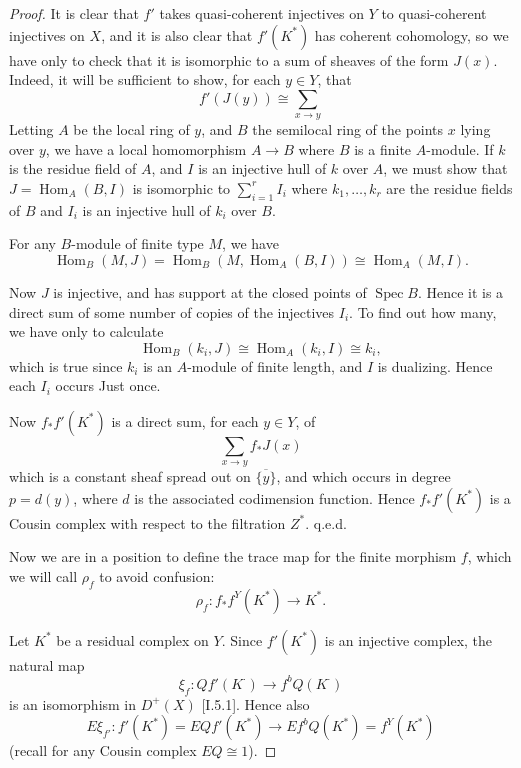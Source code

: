 \documentclass[12pt]{book}
\DeclareMathOperator{\Spec}{Spec}
\DeclareMathOperator{\Hom}{Hom}
\begin{document}
\begin{proof}
It is clear that \(f'\) takes quasi-coherent injectives on \(Y\) to quasi-coherent injectives on \(X\), and it is also clear that \(f'(K^{*})\) has coherent cohomology, so we have only to check that it is isomorphic to a sum of sheaves of the form \(J(x)\). Indeed, it will be sufficient to show, for each \(y \in Y\), that
\[f'(J(y)) \cong \sum_{x \to y}\]
Letting \(A\) be the local ring of \(y\), and \(B\) the semilocal ring of the points \(x\) lying over \(y\), we have a local homomorphism \(A \to B\) where \(B\) is a finite \(A\)-module. If \(k\) is the residue field of \(A\), and \(I\) is an injective hull of \(k\) over \(A\), we must show that \(J=\Hom_{A}(B, I)\) is isomorphic to \(\sum_{i=1}^{r} I_{i}\) where \(k_{1},\dots,k_{r}\) are the residue fields of \(B\) and \(I_{i}\) is an injective hull of \(k_{i}\) over \(B\).

For any \(B\)-module of finite type \(M\), we have
\[\Hom_{B}(M, J)=\Hom_{B}\left(M, \Hom_{A}(B, I)\right) \cong \Hom_{A}(M, I) .\]

\setcounter{page}{337}
Now \(J\) is injective, and has support at the closed points of \(\Spec B\). Hence it is a direct sum of some number of copies of the injectives \(I_{i}\). To find out how many, we have only to calculate
\[\Hom_{B}\left(k_{i}, J\right) \cong \Hom_{A}\left(k_{i}, I\right) \cong k_{i},\]
which is true since \(k_{i}\) is an \(A\)-module of finite length, and \(I\) is dualizing. Hence each \(I_{i}\) occurs Just once.

Now \(f_{*} f'(K^{*})\) is a direct sum, for each \(y \in Y\), of
\[\sum_{x \to y} f_{*} J(x)\]
which is a constant sheaf spread out on \(\overline{\{y\}}\), and which occurs in degree \(p=d(y)\), where \(d\) is the associated codimension function. Hence \(f_{*} f'(K^{*})\) is a Cousin complex with respect to the filtration \(Z^{*}\). q.e.d.

Now we are in a position to define the trace map for the finite morphism \(f\), which we will call \(\rho_{f}\) to avoid confusion:
\[\rho_{f}: f_{*} f^{Y}\left(K^{*}\right) \to K^{*} .\]

\setcounter{page}{338}
Let \(K^{*}\) be a residual complex on \(Y\).
Since \(f'\left(K^{*}\right)\) is an injective complex, the natural map
\[\xi_{f}: Q f'\left(K^{\cdot}\right) \to f^{b} Q\left(K^{\cdot}\right)\]
is an isomorphism in \(D^{+}(X)\) [I.5.1]. Hence also
\[E \xi_{f'}: f'\left(K^{*}\right)=E Q f'\left(K^{*}\right) \to E f^{b} Q\left(K^{*}\right)=f^{Y}\left(K^{*}\right)\]
(recall for any Cousin complex \(EQ \cong 1\)).


\end{proof}
\end{document}
